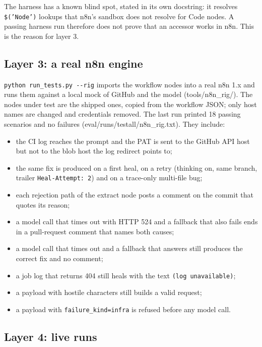 The harness has a known blind spot, stated in its own docstring: it resolves \texttt{\$('Node')} lookups that n8n's sandbox does not resolve for Code nodes. A passing harness run therefore does not prove that an accessor works in n8n. This is the reason for layer 3.

\subsection{Layer 3: a real n8n engine}

\texttt{python run\_\allowbreak{}tests.\allowbreak{}py -\allowbreak{}-\allowbreak{}rig} imports the workflow nodes into a real n8n 1.x and runs them against a local mock of GitHub and the model (tools/\allowbreak{}n8n\_\allowbreak{}rig/\allowbreak{}). The nodes under test are the shipped ones, copied from the workflow JSON; only host names are changed and credentials removed. The last run printed 18 passing scenarios and no failures (eval/\allowbreak{}runs/\allowbreak{}testall/\allowbreak{}n8n\_\allowbreak{}rig.txt). They include:

\begin{itemize}[leftmargin=*, itemsep=2pt]
\item the CI log reaches the prompt and the PAT is sent to the GitHub API host but not to the blob host the log redirect points to;
\item the same fix is produced on a first heal, on a retry (thinking on, same branch, trailer \texttt{Heal-\allowbreak{}Attempt:\allowbreak{} 2}) and on a trace-only multi-file bug;
\item each rejection path of the extract node posts a comment on the commit that quotes its reason;
\item a model call that times out with HTTP 524 and a fallback that also fails ends in a pull-request comment that names both causes;
\item a model call that times out and a fallback that answers still produces the correct fix and no comment;
\item a job log that returns 404 still heals with the text \texttt{(log unavailable)};
\item a payload with hostile characters still builds a valid request;
\item a payload with \texttt{failure\_\allowbreak{}kind=infra} is refused before any model call.
\end{itemize}

\subsection{Layer 4: live runs}


